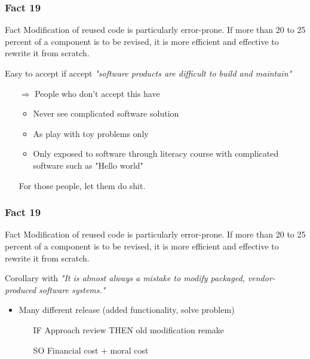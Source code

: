 \documentclass{beamer}
\begin{document}
\begin{frame}
    \frametitle{Fact 19}
    \begin{block}{Fact}
    Modification of reused code is particularly error-prone. If more than 20 to
    25 percent of a component is to be revised, it is more efficient and
    effective to rewrite it from scratch.
    \end{block}

    Easy to accept if accept \textit{"software products are difficult to
    build and maintain"}
    \begin{itemize}
        \item[$\Rightarrow$] People who don't accept this have
            \begin{itemize}
                \item Never see complicated software solution
                \item As play with toy problems only
                \item Only exposed to software through literacy
                    course with complicated software such as
                    "Hello world"
            \end{itemize}

            For those people, let them do shit.
    \end{itemize}

\end{frame}


\begin{frame}
    \frametitle{Fact 19}
    \begin{block}{Fact}
    Modification of reused code is particularly error-prone. If more than 20 to
    25 percent of a component is to be revised, it is more efficient and
    effective to rewrite it from scratch.
    \end{block}

    Corollary with \textit{"It is almost always a mistake to modify packaged,
    vendor-produced software systems."}

    \begin{itemize}
        \item Many different release (added functionality, solve problem)

            \begin{itemize}
                \item[\alert{IF}] Approach review \alert{THEN} old modification remake
                \item[\alert{SO}] Financial cost + moral cost
            \end{itemize}

    \end{itemize}
\end{frame}
\end{document}
